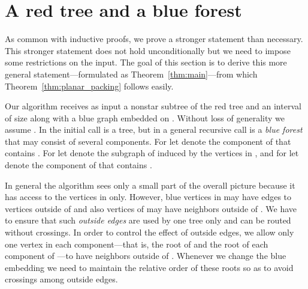 \documentclass[11pt,a4paper,colorlinks=true,urlcolor=blue,citecolor=red]{article}
\theoremstyle{plain}
\begin{document}
\section{A red tree and a blue forest}\label{sec:preT2}

As common with inductive proofs, we prove a stronger statement than
necessary. This stronger statement does not hold
unconditionally but we need to impose some restrictions on the input.
The goal of this section is to derive this more general
statement---formulated as Theorem~\ref{thm:main}---from which
Theorem~\ref{thm:planar_packing} follows easily.

Our algorithm receives as input a nonstar subtree  of the red tree
and an interval  of size  along with a blue graph 
embedded on . Without loss of generality we assume . In the
initial call  is a tree, but in a general recursive call  is a
\emph{blue forest} that may consist of several components. For
 let  denote the component of  that contains
. For  let  denote the subgraph of 
induced by the vertices in , and for  let  denote the
component of  that contains .



In general the algorithm sees only a small part of the overall picture
because it has access to the vertices in  only. However, blue
vertices in  may have edges to vertices outside of  and also
vertices of  may have neighbors outside of . We have to ensure
that such \emph{outside edges} are used by one tree only and can be
routed without crossings.
In order to control the effect of outside edges, we allow only one
vertex in each component---that is, the root of  and the root of each
component of ---to have neighbors outside of . Whenever we change
the blue embedding we need to maintain the relative order of these roots
so as to avoid crossings among outside edges.
\end{document}
